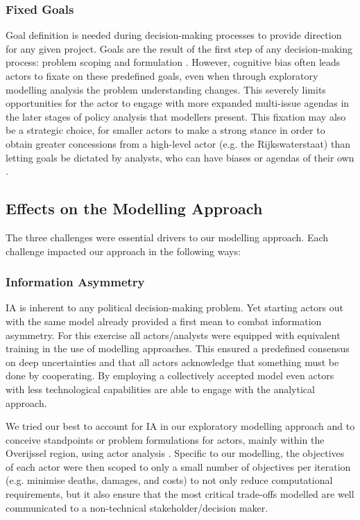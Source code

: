 \subsubsection{Fixed Goals}
Goal definition is needed during decision-making processes to provide direction for any given project. Goals are the result of the first step of any decision-making process: problem scoping and formulation \parencite{enserink_policy_2010}. However, cognitive bias often leads actors to fixate on these predefined goals, even when through exploratory modelling analysis the problem understanding changes. This severely limits opportunities for the actor to engage with more expanded multi-issue agendas in the later stages of policy analysis that modellers present. This fixation may also be a strategic choice, for smaller actors to make a strong stance in order to obtain greater concessions from a high-level actor (e.g. the Rijkswaterstaat) than letting goals be dictated by analysts, who can have biases or agendas of their own \parencite{hans_de_bruijn_mark_de_bruijne_ernst_ten_heuvelhof_politics_2015}. 

\subsection{Effects on the Modelling Approach}

The three challenges were essential drivers to our modelling approach. Each challenge impacted our approach in the following ways: 

\subsubsection{Information Asymmetry} IA is inherent to any political decision-making problem. Yet starting actors out with the same model already provided a first mean to combat information asymmetry. For this exercise all actors/analysts were equipped with equivalent training in the use of modelling approaches. This ensured a predefined consensus on deep uncertainties and that all actors acknowledge that something must be done by cooperating. By employing a collectively accepted model even actors with less technological capabilities are able to engage with the analytical approach.

We tried our best to account for IA in our exploratory modelling approach and to conceive standpoints or problem formulations for actors, mainly within the Overijssel region, using actor analysis \parencite{enserink_policy_2010}. Specific to our modelling, the objectives of each actor were then scoped to only a small number of objectives per iteration (e.g. minimise deaths, damages, and costs) to not only reduce computational requirements, but it also ensure that the most critical trade-offs modelled are well communicated to a non-technical stakeholder/decision maker. 

